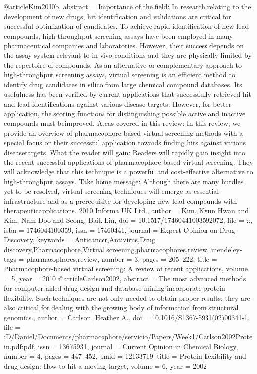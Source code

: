 @article{Kim2010b,
abstract = {Importance of the field: In research relating to the development of new drugs, hit identification and validations are critical for successful optimization of candidates. To achieve rapid identification of new lead compounds, high-throughput screening assays have been employed in many pharmaceutical companies and laboratories. However, their success depends on the assay system relevant to in vivo conditions and they are physically limited by the repertoire of compounds. As an alternative or complementary approach to high-throughput screening assays, virtual screening is an efficient method to identify drug candidates in silico from large chemical compound databases. Its usefulness has been verified by current applications that successfully retrieved hit and lead identifications against various disease targets. However, for better application, the scoring functions for distinguishing possible active and inactive compounds must beimproved. Areas covered in this review: In this review, we provide an overview of pharmacophore-based virtual screening methods with a special focus on their successful application towards finding hits against various diseasetargets. What the reader will gain: Readers will rapidly gain insight into the recent successful applications of pharmacophore-based virtual screening. They will acknowledge that this technique is a powerful and cost-effective alternative to high-throughput assays. Take home message: Although there are many hurdles yet to be resolved, virtual screening techniques will emerge as essential infrastructure and as a prerequisite for developing new lead compounds with therapeuticapplications. {\textcopyright} 2010 Informa UK Ltd.},
author = {Kim, Kyun Hwan and Kim, Nam Doo and Seong, Baik Lin},
doi = {10.1517/17460441003592072},
file = {::},
isbn = {1746044100359},
issn = {17460441},
journal = {Expert Opinion on Drug Discovery},
keywords = {Anticancer,Antivirus,Drug discovery,Pharmacophore,Virtual screening,pharmacophores,review},
mendeley-tags = {pharmacophores,review},
number = {3},
pages = {205--222},
title = {{Pharmacophore-based virtual screening: A review of recent applications}},
volume = {5},
year = {2010}
}
@article{Carlson2002,
abstract = {The most advanced methods for computer-aided drug design and database mining incorporate protein flexibility. Such techniques are not only needed to obtain proper results; they are also critical for dealing with the growing body of information from structural genomics.},
author = {Carlson, Heather A.},
doi = {10.1016/S1367-5931(02)00341-1},
file = {:D\:/Daniel/Documents/pharmacophore/servicio/Papers/Week1/Carlson2002Protein.pdf:pdf},
issn = {13675931},
journal = {Current Opinion in Chemical Biology},
number = {4},
pages = {447--452},
pmid = {12133719},
title = {{Protein flexibility and drug design: How to hit a moving target}},
volume = {6},
year = {2002}
}
